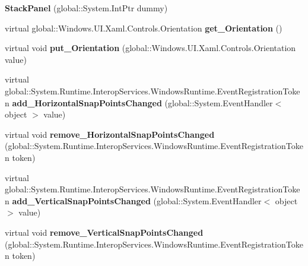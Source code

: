 \begin{DoxyCompactItemize}
{\bfseries Stack\+Panel} (global\+::\+System.\+Int\+Ptr dummy)
\item 
\mbox{\label{class_windows_1_1_u_i_1_1_xaml_1_1_controls_1_1_stack_panel_a9834a2d1432003975ba8a69f4aa789c7}} 
virtual global\+::\+Windows.\+U\+I.\+Xaml.\+Controls.\+Orientation {\bfseries get\+\_\+\+Orientation} ()
\item 
\mbox{\label{class_windows_1_1_u_i_1_1_xaml_1_1_controls_1_1_stack_panel_a99d2c21e5e153b28fba470789fc1748a}} 
virtual void {\bfseries put\+\_\+\+Orientation} (global\+::\+Windows.\+U\+I.\+Xaml.\+Controls.\+Orientation value)
\item 
\mbox{\label{class_windows_1_1_u_i_1_1_xaml_1_1_controls_1_1_stack_panel_a86815ce8db81cb7b06e7beebaa97e788}} 
virtual global\+::\+System.\+Runtime.\+Interop\+Services.\+Windows\+Runtime.\+Event\+Registration\+Token {\bfseries add\+\_\+\+Horizontal\+Snap\+Points\+Changed} (global\+::\+System.\+Event\+Handler$<$ object $>$ value)
\item 
\mbox{\label{class_windows_1_1_u_i_1_1_xaml_1_1_controls_1_1_stack_panel_aabdd867d8e829595aa1cd0066bb43b7c}} 
virtual void {\bfseries remove\+\_\+\+Horizontal\+Snap\+Points\+Changed} (global\+::\+System.\+Runtime.\+Interop\+Services.\+Windows\+Runtime.\+Event\+Registration\+Token token)
\item 
\mbox{\label{class_windows_1_1_u_i_1_1_xaml_1_1_controls_1_1_stack_panel_ad8defe3d3a6f357c9736a835aaf0d633}} 
virtual global\+::\+System.\+Runtime.\+Interop\+Services.\+Windows\+Runtime.\+Event\+Registration\+Token {\bfseries add\+\_\+\+Vertical\+Snap\+Points\+Changed} (global\+::\+System.\+Event\+Handler$<$ object $>$ value)
\item 
\mbox{\label{class_windows_1_1_u_i_1_1_xaml_1_1_controls_1_1_stack_panel_ad941c568cedfbb247496984f450b1857}} 
virtual void {\bfseries remove\+\_\+\+Vertical\+Snap\+Points\+Changed} (global\+::\+System.\+Runtime.\+Interop\+Services.\+Windows\+Runtime.\+Event\+Registration\+Token token)

\end{DoxyCompactItemize}
